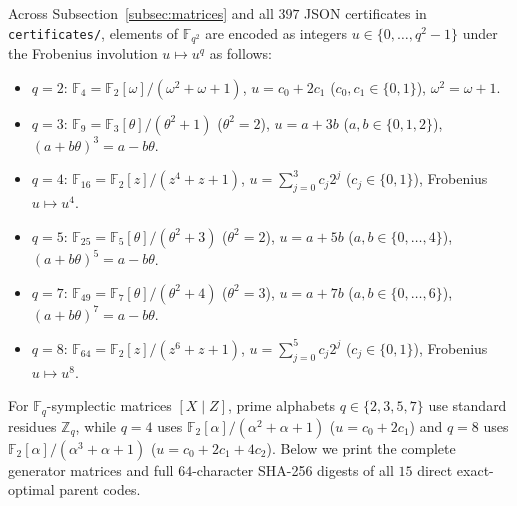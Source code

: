 \documentclass[11pt,a4paper]{article}
\theoremstyle{remark}
\begin{document}
Across Subsection~\ref{subsec:matrices} and all $397$ JSON certificates in \texttt{certificates/}, elements of $\mathbb{F}_{q^2}$ are encoded as integers $u \in \{0, \dots, q^2 - 1\}$ under the Frobenius involution $u \mapsto u^q$ as follows:
\begin{itemize}\small
  \item $q = 2$: $\mathbb{F}_4 = \mathbb{F}_2[\omega]/(\omega^2 + \omega + 1)$, $u = c_0 + 2c_1$ ($c_0, c_1 \in \{0, 1\}$), $\omega^2 = \omega + 1$.
  \item $q = 3$: $\mathbb{F}_9 = \mathbb{F}_3[\theta]/(\theta^2 + 1)$ ($\theta^2 = 2$), $u = a + 3b$ ($a, b \in \{0, 1, 2\}$), $(a + b\theta)^3 = a - b\theta$.
  \item $q = 4$: $\mathbb{F}_{16} = \mathbb{F}_2[z]/(z^4 + z + 1)$, $u = \sum_{j=0}^3 c_j 2^j$ ($c_j \in \{0, 1\}$), Frobenius $u \mapsto u^4$.
  \item $q = 5$: $\mathbb{F}_{25} = \mathbb{F}_5[\theta]/(\theta^2 + 3)$ ($\theta^2 = 2$), $u = a + 5b$ ($a, b \in \{0, \dots, 4\}$), $(a + b\theta)^5 = a - b\theta$.
  \item $q = 7$: $\mathbb{F}_{49} = \mathbb{F}_7[\theta]/(\theta^2 + 4)$ ($\theta^2 = 3$), $u = a + 7b$ ($a, b \in \{0, \dots, 6\}$), $(a + b\theta)^7 = a - b\theta$.
  \item $q = 8$: $\mathbb{F}_{64} = \mathbb{F}_2[z]/(z^6 + z + 1)$, $u = \sum_{j=0}^5 c_j 2^j$ ($c_j \in \{0, 1\}$), Frobenius $u \mapsto u^8$.
\end{itemize}
For $\mathbb{F}_q$-symplectic matrices $[X \mid Z]$, prime alphabets $q \in \{2, 3, 5, 7\}$ use standard residues $\mathbb{Z}_q$, while $q = 4$ uses $\mathbb{F}_2[\alpha]/(\alpha^2 + \alpha + 1)$ ($u = c_0 + 2c_1$) and $q = 8$ uses $\mathbb{F}_2[\alpha]/(\alpha^3 + \alpha + 1)$ ($u = c_0 + 2c_1 + 4c_2$). Below we print the complete generator matrices and full $64$-character SHA-256 digests of all $15$ direct exact-optimal parent codes.
\end{document}
